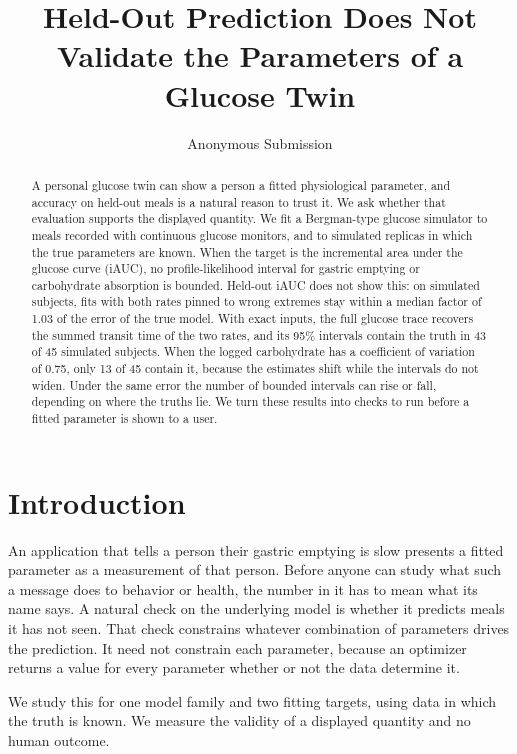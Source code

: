 \documentclass[letterpaper]{article} %
\title{Held-Out Prediction Does Not Validate the Parameters of a Glucose Twin}
\author{
    Anonymous Submission
}
\newcommand{\resNegZeroFastRefitIauc}{1.03}
\newcommand{\wsN}{45}
\newcommand{\wsRandAThreeQuarterCover}{13}
\newcommand{\wsRandAZeroCover}{43}
\begin{document}
\maketitle

\begin{abstract}
A personal glucose twin can show a person a fitted physiological parameter, and accuracy on held-out meals is a natural reason to trust it. We ask whether that evaluation supports the displayed quantity. We fit a Bergman-type glucose simulator to meals recorded with continuous glucose monitors, and to simulated replicas in which the true parameters are known. When the target is the incremental area under the glucose curve (iAUC), no profile-likelihood interval for gastric emptying or carbohydrate absorption is bounded. Held-out iAUC does not show this: on simulated subjects, fits with both rates pinned to wrong extremes stay within a median factor of \resNegZeroFastRefitIauc{} of the error of the true model. With exact inputs, the full glucose trace recovers the summed transit time of the two rates, and its 95\% intervals contain the truth in \wsRandAZeroCover{} of \wsN{} simulated subjects. When the logged carbohydrate has a coefficient of variation of 0.75, only \wsRandAThreeQuarterCover{} of \wsN{} contain it, because the estimates shift while the intervals do not widen. Under the same error the number of bounded intervals can rise or fall, depending on where the truths lie. We turn these results into checks to run before a fitted parameter is shown to a user.
\end{abstract}

\section{Introduction}

An application that tells a person their gastric emptying is slow presents a fitted parameter as a measurement of that person. Before anyone can study what such a message does to behavior or health, the number in it has to mean what its name says. A natural check on the underlying model is whether it predicts meals it has not seen. That check constrains whatever combination of parameters drives the prediction. It need not constrain each parameter, because an optimizer returns a value for every parameter whether or not the data determine it.

We study this for one model family and two fitting targets, using data in which the truth is known. We measure the validity of a displayed quantity and no human outcome.
\end{document}
